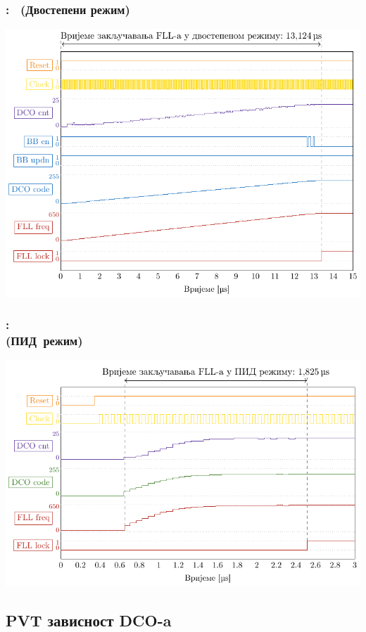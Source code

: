 \documentclass[aspectratio=169]{beamer}
\def \DCO  {DCO} %
\def \PID  {ПИД} %
\begin{document}
\begin{frame}
	\frametitle{\secname: \subsecname\ (Двостепени режим)}
	\centering
	\includegraphics[scale=0.7]{slike/prezentacija/sim_BB.pdf}
\end{frame}

\begin{frame}
	\frametitle{\secname: \subsecname\ \\(\PID\ режим)}
	\begin{center}
		\includegraphics[scale=0.8]{slike/prezentacija/sim_PID.pdf}	
	\end{center}
\end{frame}

\subsection{PVT зависност \DCO-a}
\end{document}

